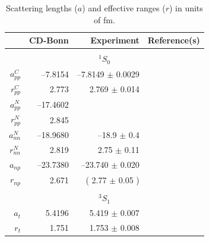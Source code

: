 \begin{table}
\caption{Scattering lengths ($a$) and effective ranges ($r$) in units of fm.}
\begin{tabular}{rddl}
                   
 & CD-Bonn 
 & Experiment
 & Reference(s)
\\
\hline 
\\
 \\
$a_{pp}^C$ & --7.8154  &--7.8149 $\pm$ 0.0029 & \cite{SES83}\\
$r_{pp}^C$ &  2.773   & 2.769 $\pm$ 0.014  & \cite{SES83}\\
$a_{pp}^N$ &--17.4602  &                   &             \\
$r_{pp}^N$ &  2.845   &                   &             \\
$a_{nn}^N$ &--18.9680  &--18.9 $\pm$ 0.4    & \cite{How98,Gon99}\\
$r_{nn}^N$ &  2.819   & 2.75 $\pm$ 0.11   & \cite{MNS90}\\
$a_{np}  $ &--23.7380  &--23.740 $\pm$ 0.020  & \cite{KMS84}\\
$r_{np}  $ &  2.671   &( 2.77  $\pm$ 0.05 )  & \cite{KMS84}\\
\\
 \\
$a_t$ &  5.4196  & 5.419 $\pm$ 0.007  & \cite{KMS84}\\
$r_t$ &  1.751   & 1.753 $\pm$ 0.008  & \cite{KMS84}\\
\end{tabular}
\label{tab_lep}
\end{table}




\pagebreak


